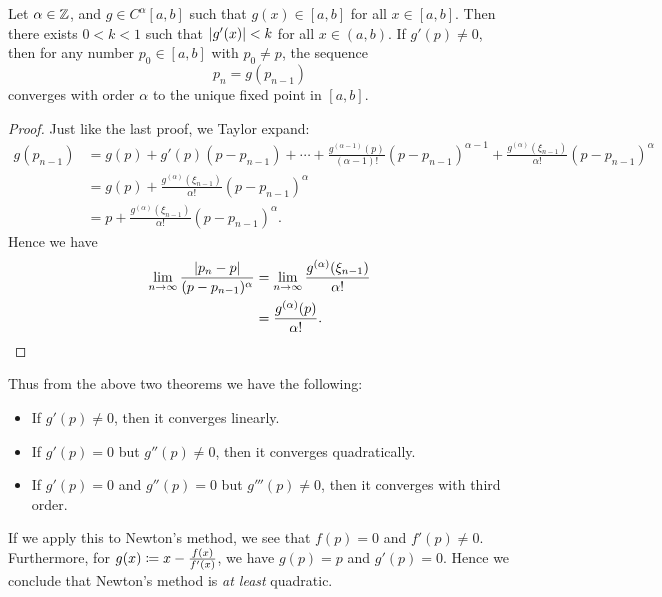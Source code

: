 \documentclass[class=article, crop=false]{standalone}
\begin{document}
  \begin{theorem}{}
    Let $\alpha\in\mathbb{Z}$, and $g\in C^\alpha[a, b]$ such that $g(x)\in [a, b]$ for all $x\in [a, b]$. Then there exists $0 < k < 1$ such that $\left\lvert g'(x) \right\rvert < k$ for all $x\in (a, b)$. If $g'(p)\neq 0$, then for any number $p_0\in [a, b]$ with $p_0\neq p$, the sequence
    \[
      p_n = g(p_{n - 1})\tag{$n\geq 1$}
    \]
    converges with order $\alpha$ to the unique fixed point in $[a, b]$.
    \begin{proof}
      Just like the last proof, we Taylor expand:
      \begin{align*}
        g(p_{n - 1}) &= g(p) + g'(p)(p - p_{n - 1}) + \dotsb + \frac{g^{(\alpha - 1)}(p)}{(\alpha - 1)!}(p - p_{n - 1})^{\alpha - 1} + \frac{g^{(\alpha)}(\xi_{n - 1})}{\alpha!}(p - p_{n - 1})^\alpha \\
                     &= g(p) + \frac{g^{(\alpha)}(\xi_{n - 1})}{\alpha!}(p - p_{n - 1})^\alpha \\
                     &= p + \frac{g^{(\alpha)}(\xi_{n - 1})}{\alpha!}(p - p_{n - 1})^\alpha.
      \end{align*}
      Hence we have
      \begin{align*}
        \lim_{n\to \infty} \frac{\left\lvert p_n - p \right\rvert}{(p - p_{n - 1})^\alpha} &= \lim_{n\to \infty} \frac{g^{(\alpha)}(\xi_{n - 1})}{\alpha!} \\
                                                                        &= \frac{g^{(\alpha)}(p)}{\alpha!}.
      \end{align*}
    \end{proof}
  \end{theorem}
  Thus from the above two theorems we have the following:
  \begin{itemize}
    \item If $g'(p)\neq 0$, then it converges linearly.
    \item If $g'(p) = 0$ but $g''(p)\neq 0$, then it converges quadratically.
    \item If $g'(p) = 0$ and $g''(p) = 0$ but $g'''(p)\neq 0$, then it converges with third order.
  \end{itemize}
  If we apply this to Newton's method, we see that $f(p) = 0$ and $f'(p)\neq 0$. Furthermore, for $g(x)\coloneqq x - \frac{f(x)}{f'(x)}$, we have $g(p) = p$ and $g'(p) = 0$. Hence we conclude that Newton's method is \emph{at least} quadratic.
  
\end{document}
